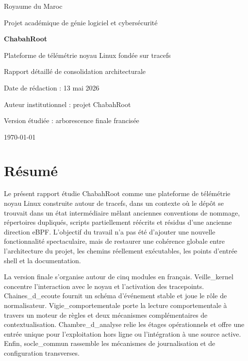 \documentclass[12pt,a4paper]{report}
\begin{document}
\begin{titlepage}
\centering
{\Large Royaume du Maroc \par}
\vspace{0.8cm}
{\Large Projet académique de génie logiciel et cybersécurité \par}
\vspace{2.0cm}
{\Huge \textbf{ChabahRoot} \par}
\vspace{0.5cm}
{\LARGE Plateforme de télémétrie noyau Linux fondée sur tracefs \par}
\vspace{1.3cm}
{\large Rapport détaillé de consolidation architecturale \par}
\vspace{0.8cm}
{\large Date de rédaction : 13 mai 2026 \par}
\vfill
{\large Auteur institutionnel : projet ChabahRoot \par}
\vspace{0.3cm}
{\large Version étudiée : arborescence finale francisée \par}
\vfill
{\large \today \par}
\end{titlepage}


\chapter*{Résumé}
Le présent rapport étudie ChabahRoot comme une plateforme de télémétrie noyau Linux construite autour de tracefs, dans un contexte où le dépôt se trouvait dans un état intermédiaire mêlant anciennes conventions de nommage, répertoires dupliqués, scripts partiellement réécrits et résidus d’une ancienne direction eBPF. L’objectif du travail n’a pas été d’ajouter une nouvelle fonctionnalité spectaculaire, mais de restaurer une cohérence globale entre l’architecture du projet, les chemins réellement exécutables, les points d’entrée shell et la documentation.

La version finale s’organise autour de cinq modules en français. Veille\_kernel concentre l’interaction avec le noyau et l’activation des tracepoints. Chaines\_d\_ecoute fournit un schéma d’événement stable et joue le rôle de normalisateur. Vigie\_comportementale porte la lecture comportementale à travers un moteur de règles et deux mécanismes complémentaires de contextualisation. Chambre\_d\_analyse relie les étages opérationnels et offre une entrée unique pour l’exploitation hors ligne ou l’intégration à une source active. Enfin, socle\_commun rassemble les mécanismes de journalisation et de configuration transverses.
\end{document}
